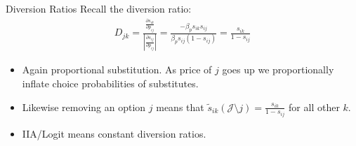 \documentclass[xcolor=pdftex,dvipsnames,table,mathserif,aspectratio=169]{beamer}
\begin{document}
\begin{frame}{Diversion Ratios}
Recall the diversion ratio:
\begin{align*}
D_{jk} =\frac{\frac{\partial s_{ik}}{\partial p_{ij}}}{\left |\frac{\partial s_{ij}}{\partial p_{ij}} \right|} = \frac{- \beta_p s_{ik} s_{ij}}{\beta_p s_{ij} (1-s_{ij})} = \frac{s_{ik}}{1-s_{ij}}
\end{align*}
\begin{itemize}
\item Again proportional substitution. As price of $j$ goes up we proportionally inflate choice probabilities of substitutes.
\item Likewise removing an option $j$ means that $\tilde{s}_{ik}(\mathcal{J} \setminus j) = \frac{s_{ik}}{1-s_{ij}}$ for all other $k$.
\item IIA/Logit means \alert{constant diversion ratios}.
\end{itemize}
\end{frame}
%
%
%
%
%
%
%
\end{document}
